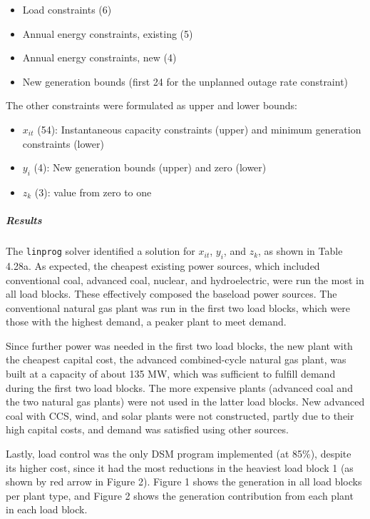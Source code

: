 \documentclass{article}
\begin{document}
	\begin{itemize}
		\item Load constraints (6)
		\item Annual energy constraints, existing (5)
		\item Annual energy constraints, new (4)
		\item New generation bounds (first 24 for the unplanned outage rate constraint)
	\end{itemize}
	
	The other constraints were formulated as upper and lower bounds:
	
	\begin{itemize}
		\item $x_{it}$ (54): Instantaneous capacity constraints (upper) and minimum generation constraints (lower)
		\item $y_i$ (4): New generation bounds (upper) and zero (lower)
		\item $z_k$ (3): value from zero to one
	\end{itemize}
	
	
	\subparagraph{Results}
	The \texttt{linprog} solver identified a solution for $x_{it}$, $y_i$, and $z_k$, as shown in Table 4.28a. As expected, the cheapest existing power sources, which included conventional coal, advanced coal, nuclear, and hydroelectric, were run the most in all load blocks. These effectively composed the baseload power sources. The conventional natural gas plant was run in the first two load blocks, which were those with the highest demand, a peaker plant to meet demand. 
	
	Since further power was needed in the first two load blocks, the new plant with the cheapest capital cost, the advanced combined-cycle natural gas plant, was built at a capacity of about 135 MW, which was sufficient to fulfill demand during the first two load blocks. The more expensive plants (advanced coal and the two natural gas plants) were not used in the latter load blocks. New advanced coal with CCS, wind, and solar plants were not constructed, partly due to their high capital costs, and demand was satisfied using other sources. 
	
	Lastly, load control was the only DSM program implemented (at 85\%), despite its higher cost, since it had the most reductions in the heaviest load block 1 (as shown by red arrow in Figure 2). Figure 1 shows the generation in all load blocks per plant type, and Figure 2 shows the generation contribution from each plant in each load block.
	
\end{document}

